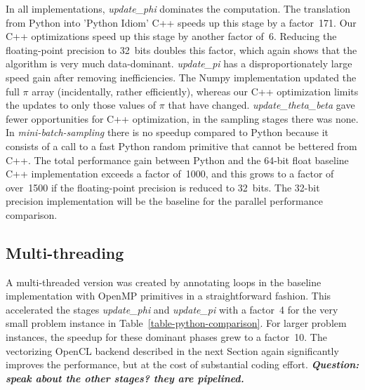 In all implementations, \textit{update\_phi} dominates the computation.
The translation from Python into 'Python Idiom' C++ speeds up this stage
by a factor~171. %
Our C++ optimizations speed up this stage
by another factor of~6. Reducing the floating-point precision to 32~bits
doubles this factor, which again shows that the algorithm is very much data-dominant.
%
\textit{update\_pi} has a disproportionately large speed
gain after removing inefficiencies. The Numpy implementation updated the full
$\pi$ array (incidentally, rather efficiently), whereas our C++ optimization
limits the updates to only those values of $\pi$ that have changed.
%
\textit{update\_theta\_beta} gave fewer opportunities for C++ optimization,
in the sampling stages there was none. In \textit{mini-batch-sampling} there
is no speedup compared to Python because it consists of a call to
a fast Python random primitive that cannot be bettered from C++.
The total performance gain between Python and the 64-bit float baseline C++
implementation exceeds a factor of~1000, and this grows to a factor of over~1500
if the floating-point precision is reduced to 32~bits. The 32-bit precision
implementation will be the baseline for the parallel performance comparison.

\subsection{Multi-threading}

A multi-threaded version was created by annotating loops in the
baseline implementation with OpenMP primitives in a straightforward
fashion. This accelerated the stages \textit{update\_phi} and
\textit{update\_pi} with a factor~4 for the very small problem instance
in Table~\ref{table-python-comparison}. For larger problem instances, the
speedup for these dominant phases grew to a factor~10. The vectorizing OpenCL
backend described in the next Section again significantly improves the
performance, but at the cost of substantial coding effort.
\textbf{\emph{Question: speak about the other stages? they are pipelined.}}

\begin{comment}
The introduction of a custom user-space random generator brings at most
a very small
benefit. We show it, because it is necessary for the multi-threaded
implementations described in the next section, and this measurement serves to
prove that it does not harm execution speed.
\end{comment}
